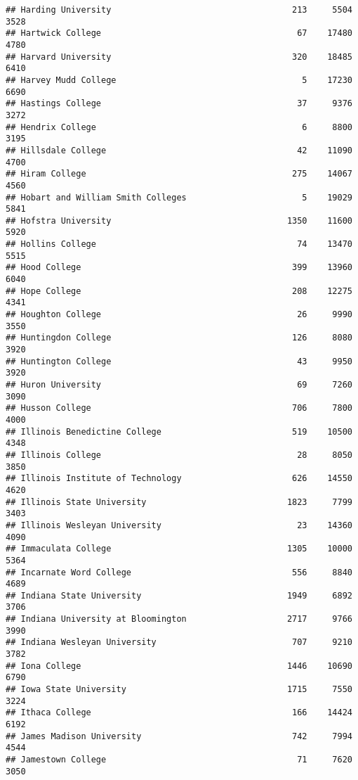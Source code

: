\documentclass[
]{article}
\begin{document}
\begin{verbatim}
## Harding University                                    213     5504       3528
## Hartwick College                                       67    17480       4780
## Harvard University                                    320    18485       6410
## Harvey Mudd College                                     5    17230       6690
## Hastings College                                       37     9376       3272
## Hendrix College                                         6     8800       3195
## Hillsdale College                                      42    11090       4700
## Hiram College                                         275    14067       4560
## Hobart and William Smith Colleges                       5    19029       5841
## Hofstra University                                   1350    11600       5920
## Hollins College                                        74    13470       5515
## Hood College                                          399    13960       6040
## Hope College                                          208    12275       4341
## Houghton College                                       26     9990       3550
## Huntingdon College                                    126     8080       3920
## Huntington College                                     43     9950       3920
## Huron University                                       69     7260       3090
## Husson College                                        706     7800       4000
## Illinois Benedictine College                          519    10500       4348
## Illinois College                                       28     8050       3850
## Illinois Institute of Technology                      626    14550       4620
## Illinois State University                            1823     7799       3403
## Illinois Wesleyan University                           23    14360       4090
## Immaculata College                                   1305    10000       5364
## Incarnate Word College                                556     8840       4689
## Indiana State University                             1949     6892       3706
## Indiana University at Bloomington                    2717     9766       3990
## Indiana Wesleyan University                           707     9210       3782
## Iona College                                         1446    10690       6790
## Iowa State University                                1715     7550       3224
## Ithaca College                                        166    14424       6192
## James Madison University                              742     7994       4544
## Jamestown College                                      71     7620       3050

\end{verbatim}
\end{document}
